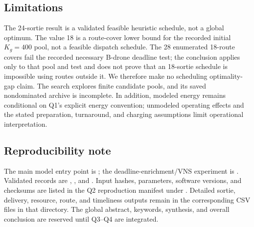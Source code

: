 \begin{samepage}
\subsection{Limitations}
The 24-sortie result is a validated feasible heuristic schedule, not a global optimum. The value 18 is a route-cover lower bound for the recorded initial $K_g=400$ pool, not a feasible dispatch schedule. The 28 enumerated 18-route covers fail the recorded necessary B-drone deadline test; the conclusion applies only to that pool and test and does not prove that an 18-sortie schedule is impossible using routes outside it. We therefore make no scheduling optimality-gap claim. The search explores finite candidate pools, and its saved nondominated archive is incomplete. In addition, modeled energy remains conditional on Q1's explicit energy convention; unmodeled operating effects and the stated preparation, turnaround, and charging assumptions limit operational interpretation.

\subsection*{Reproducibility note}
\begingroup\raggedright
The main model entry point is ; the deadline-enrichment/VNS experiment is . Validated records are , , and . Input hashes, parameters, software versions, and checksums are listed in the Q2 reproduction manifest under . Detailed sortie, delivery, resource, route, and timeliness outputs remain in the corresponding CSV files in that directory. The global abstract, keywords, synthesis, and overall conclusion are reserved until Q3--Q4 are integrated.\par\endgroup
\end{samepage}
